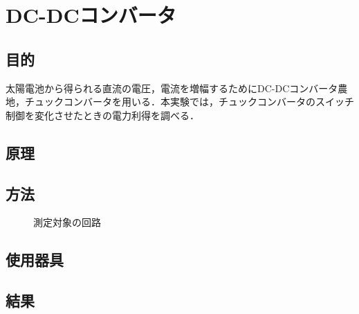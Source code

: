 \documentclass[1_power_supply.tex]{subfiles}
\begin{document}
\section{DC-DCコンバータ}

\subsection{目的}

太陽電池から得られる直流の電圧，電流を増幅するためにDC-DCコンバータ農地，チュックコンバータを用いる．本実験では，チュックコンバータのスイッチ制御を変化させたときの電力利得を調べる．

\subsection{原理}

\subsection{方法}

\begin{figure}[htbp]
	\begin{center}
		\caption{測定対象の回路}\label{fig:1_4}
	\end{center}
\end{figure}

\subsection{使用器具}

\subsection{結果}
\end{document}
